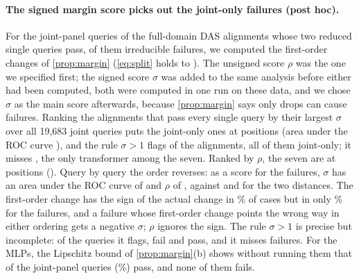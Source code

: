 \paragraph{The signed margin score picks out the joint-only failures (post hoc).}
For the \TrnMbQueries{} joint-panel queries of the full-domain DAS alignments whose two reduced single queries pass,
\TrnMbIrreducible{} of them irreducible failures, we computed the first-order changes of \cref{prop:margin}
(\cref{eq:split} holds to \TrnMbIdentity). The unsigned score $\rho$ was the one we specified first; the signed score
$\sigma$ was added to the same analysis before either had been computed, both were computed in one run on these data,
and we chose $\sigma$ as the main score afterwards, because \cref{prop:margin} says only drops can cause failures.
Ranking the \TrnPerfect{} alignments that pass every single query by their largest $\sigma$ over all 19,683 joint
queries puts the \TrnPerfectJointFailWord{} joint-only ones at positions \TrnMbRanksSigned{} (area under the ROC curve
\TrnMbAlignAucSigned), and the rule $\sigma>1$ flags \TrnMbRuleFlagged{} of the \TrnPerfect{} alignments, all of them
joint-only; it misses \TrnMbMissed, the only transformer among the seven. Ranked by $\rho$, the seven are at positions
\TrnMbRanks{} (\TrnMbAlignAuc). Query by query the order reverses: as a score for the failures, $\sigma$ has an area
under the ROC curve of \TrnMbAucSigned{} and $\rho$ of \TrnMbAuc, against \TrnAucMin{} and \TrnAucMax{} for the two
distances. The first-order change has the sign of the actual change in \TrnMbSign\% of cases but in only
\TrnMbSignIrr\% for the failures, and a failure whose first-order change points the wrong way in either ordering gets
a negative $\sigma$; $\rho$ ignores the sign. The rule $\sigma>1$ is precise but incomplete: of the queries it flags,
\TrnMbRuleTP{} fail and \TrnMbRuleFP{} pass, and it misses \TrnMbRuleFN{} failures. For the MLPs, the Lipschitz bound
of \cref{prop:margin}(b) shows without running them that \TrnMbLipCertified{} of the \TrnMbLipQueries{} joint-panel
queries (\TrnMbLipShare\%) pass, and none of them fails.

